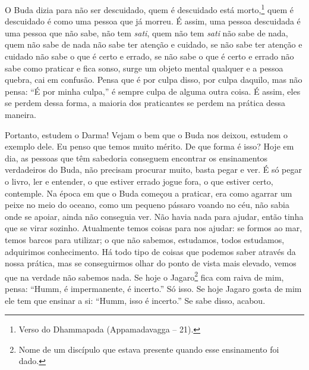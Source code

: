 O Buda dizia para não ser descuidado, quem é descuidado está
morto,\footnote{Verso do Dhammapada (Appamadavagga – 21).} quem é
descuidado é como uma pessoa que já morreu. É assim, uma pessoa
descuidada é uma pessoa que não sabe, não tem \textit{sati}, quem não
tem \textit{sati} não sabe de nada, quem não sabe de nada não sabe ter
atenção e cuidado, se não sabe ter atenção e cuidado não sabe o que é
certo e errado, se não sabe o que é certo e errado não sabe como
praticar e fica sonso, surge um objeto mental qualquer e a pessoa
quebra, cai em confusão. Pensa que é por culpa disso, por culpa
daquilo, mas não pensa: “É por minha culpa,” é sempre culpa de alguma
outra coisa. É assim, eles se perdem dessa forma, a maioria dos
praticantes se perdem na prática dessa maneira. 

Portanto, estudem o Darma! Vejam o bem que o Buda nos deixou,
estudem o exemplo dele. Eu penso que temos muito mérito. De que forma é
isso? Hoje em dia, as pessoas que têm sabedoria conseguem encontrar os
ensinamentos verdadeiros do Buda, não precisam procurar muito, basta
pegar e ver. É só pegar o livro, ler e entender, o que estiver errado
jogue fora, o que estiver certo, contemple. Na época em que o Buda
começou a praticar, era como agarrar um peixe no meio do oceano, como
um pequeno pássaro voando no céu, não sabia onde se apoiar, ainda não
conseguia ver. Não havia nada para ajudar, então tinha que se virar
sozinho. Atualmente temos coisas para nos ajudar: se formos ao mar,
temos barcos para utilizar; o que não sabemos, estudamos, todos
estudamos, adquirimos conhecimento. Há todo tipo de coisas que podemos
saber através da nossa prática, mas se conseguirmos olhar do ponto de
vista mais elevado, vemos que na verdade não sabemos nada. Se hoje o
Jagaro\footnote{Nome de um discípulo que estava presente quando esse
ensinamento foi dado.} fica com raiva de mim, pensa: “Humm, é
impermanente, é incerto.” Só isso. Se hoje Jagaro gosta de mim ele tem
que ensinar a si: “Humm, isso é incerto.” Se sabe disso, acabou. 

